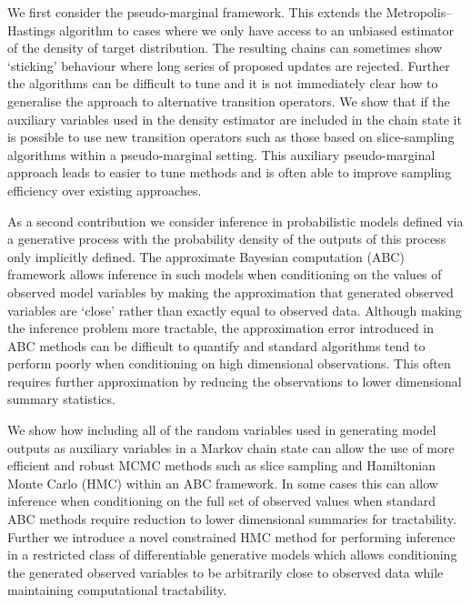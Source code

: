 We first consider the pseudo-marginal framework. This extends the Metropolis–Hastings algorithm to cases where we only have access to an unbiased estimator of the density of target distribution. The resulting chains can sometimes show ‘sticking’ behaviour where long series of proposed updates are rejected. Further the algorithms can be difficult to tune and it is not immediately clear how to generalise the approach to alternative transition operators. We show that if the auxiliary variables used in the density estimator are included in the chain state it is possible to use new transition operators such as those based on slice-sampling algorithms within a pseudo-marginal setting. This auxiliary pseudo-marginal approach leads to easier to tune methods and is often able to improve sampling efficiency over existing approaches.

As a second contribution we consider inference in probabilistic models defined via a generative process with the probability density of the outputs of this process only implicitly defined. The approximate Bayesian computation (ABC) framework allows inference in such models when conditioning on the values of observed model variables by making the approximation that generated observed variables are ‘close’ rather than exactly equal to observed data. Although making the inference problem more tractable, the approximation error introduced in ABC methods can be difficult to quantify and standard algorithms tend to perform poorly when conditioning on high dimensional observations. This often requires further approximation by reducing the observations to lower dimensional summary statistics.

We show how including all of the random variables used in generating model outputs as auxiliary variables in a Markov chain state can allow the use of more efficient and robust MCMC methods such as slice sampling and Hamiltonian Monte Carlo (HMC) within an ABC framework. In some cases this can allow inference when conditioning on the full set of observed values when standard ABC methods require reduction to lower dimensional summaries for tractability. Further we introduce a novel constrained HMC method for performing inference in a restricted class of differentiable generative models which allows conditioning the generated observed variables to be arbitrarily close to observed data while maintaining computational tractability.

